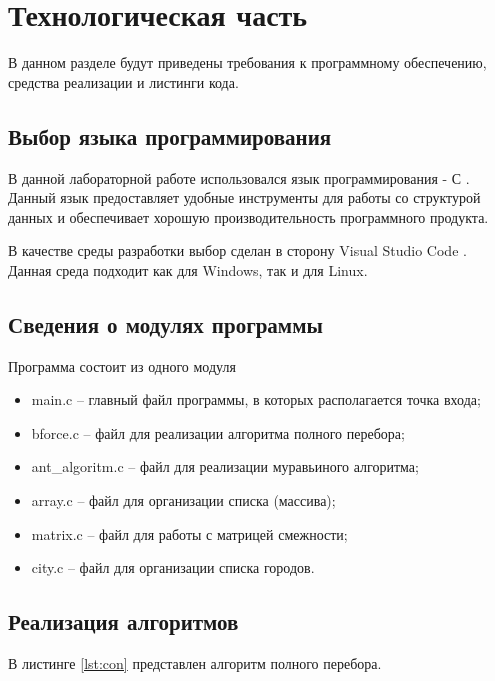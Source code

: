 \chapter{Технологическая часть}
В данном разделе будут приведены требования к программному обеспечению, средства реализации и листинги кода.

\section{Выбор языка программирования}

В данной лабораторной работе использовался язык программирования - С \cite{lang_c}. Данный язык предоставляет удобные инструменты для работы со структурой данных и обеспечивает хорошую производительность программного продукта.
 
В качестве среды разработки выбор сделан в сторону Visual Studio Code \cite{wind}. Данная среда подходит как для Windows, так и для Linux.

\section{Сведения о модулях программы}
Программа состоит из одного модуля
\begin{itemize}
	\item main.c -- главный файл программы, в которых располагается точка входа;
	\item bforce.c -- файл для реализации алгоритма полного перебора;
	\item ant\_algoritm.c -- файл для реализации муравьиного алгоритма;
	\item array.c -- файл для организации списка (массива);
	\item matrix.c -- файл для работы с матрицей смежности;
	\item city.c -- файл для организации списка городов.
\end{itemize}

\section{Реализация алгоритмов}

В листинге \ref{lst:con} представлен алгоритм полного перебора.

